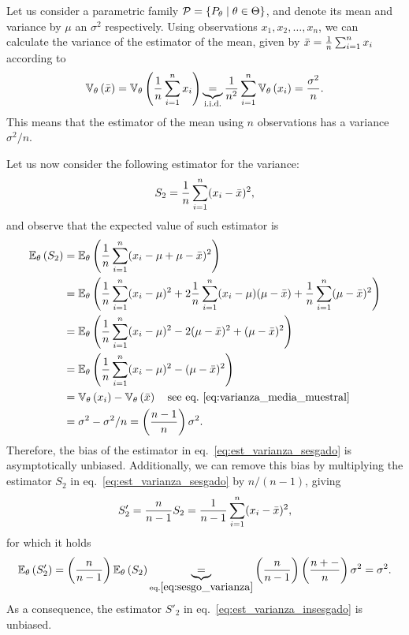 \begin{example}[Pythagoras]
Let us consider a parametric family $\mathcal{P} = \{P_\theta \mid \theta\in\Theta\}$, and denote its mean and variance by $\mu$ an $\sigma^2$ respectively. Using observations $x_1,x_2,\ldots,x_n$, we can calculate the variance of the estimator of the mean, given by ${ \bar{x}} = \frac{1}{n}\sum_{i=1}^n x_i$ according to 
\begin{equation}
	\label{eq:varianza_media_muestral}
 	\mathbb{V}_\theta \left({ \bar{x}}\right) = \mathbb{V}_\theta \left(\frac{1}{n}	\sum_{i=1}^n x_i\right)  \underbrace{=}_{\text{i.i.d.}}  \frac{1}{n^2}	\sum_{i=1}^n\mathbb{V}_\theta \left( x_i\right) =\frac{\sigma^2}{n}.
 \end{equation} 
 This means that the estimator of the mean using $n$ observations has a variance $\sigma^2/n$.

 Let us now consider the following estimator for the variance: 
\begin{equation}
	\label{eq:est_varianza_sesgado}
	S_2 = \frac{1}{n}\sum_{i=1}^n (x_i-{ \bar{x}})^2,
\end{equation}
and observe that the expected value of such estimator is
\begin{align}
	\label{eq:sesgo_varianza}
	\mathbb{E}_\theta \left(S_2 \right) &= \mathbb{E}_\theta \left(\frac{1}{n}\sum_{i=1}^n (x_i-\mu+\mu-{ \bar{x}})^2\right)\nonumber\\
				&= \mathbb{E}_\theta \left( \frac{1}{n}\sum_{i=1}^n(x_i-\mu)^2 + 2\frac{1}{n}\sum_{i=1}^n(x_i-\mu)(\mu-{ \bar{x}}) + \frac{1}{n}\sum_{i=1}^n(\mu-{ \bar{x}})^2\right)\nonumber\\
				&= \mathbb{E}_\theta \left( \frac{1}{n}\sum_{i=1}^n(x_i-\mu)^2 - 2(\mu-{ \bar{x}})^2 + (\mu-{ \bar{x}})^2\right)\nonumber\\
				&= \mathbb{E}_\theta \left( \frac{1}{n}\sum_{i=1}^n(x_i-\mu)^2 - (\mu-{ \bar{x}})^2\right)\nonumber\\
				&= \mathbb{V}_\theta \left(x_i\right) - \mathbb{V}_\theta \left({ \bar{x}}\right)\quad\text{see eq.~\eqref{eq:varianza_media_muestral}}\nonumber\\
				&= 	\sigma^2 - \sigma^2/n = \left(\frac{n-1}{n}\right)\sigma^2.
\end{align}
Therefore, the bias of the estimator in eq.~\eqref{eq:est_varianza_sesgado} is asymptotically unbiased. Additionally, we can remove this bias by multiplying the estimator $S_2$ in eq.~\eqref{eq:est_varianza_sesgado} by $n/(n-1)$, giving
\begin{equation}
	\label{eq:est_varianza_insesgado}
	S'_2 = \frac{n}{n-1}S_2 =  \frac{1}{n-1}\sum_{i=1}^n (x_i-{ \bar{x}})^2,
\end{equation}
for which it holds
\begin{equation}
	\mathbb{E}_\theta \left(S'_2 \right) =  \left(\frac{n}{n-1}\right)\mathbb{E}_\theta \left(S_2\right) \underbrace{=}_{\text{eq.}\eqref{eq:sesgo_varianza}} \left(\frac{n}{n-1}\right) \left(\frac{n+-}{n}\right)\sigma^2 = \sigma^2.
\end{equation}
As a consequence, the estimator $S'_2$ in eq.~\eqref{eq:est_varianza_insesgado} is unbiased.
\end{example}


